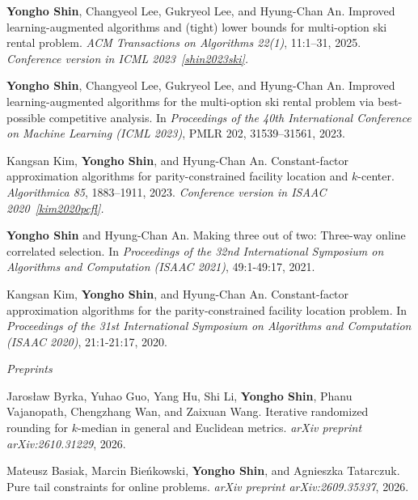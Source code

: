 \documentclass{article}
\begin{document}
\begin{enumerate}[label={[\arabic*]}]
	\item \label{shin2025ski} \textbf{Yongho Shin}, Changyeol Lee, Gukryeol Lee, and Hyung-Chan An. Improved learning-augmented algorithms and (tight) lower bounds for multi-option ski rental problem. \emph{ACM Transactions on Algorithms 22(1)}, 11:1--31, 2025. \emph{Conference version in ICML 2023~\ref{shin2023ski}.}
	
	\item \label{shin2023ski} \textbf{Yongho Shin}, Changyeol Lee, Gukryeol Lee, and Hyung-Chan An. Improved learning-augmented algorithms for the multi-option ski rental problem via best-possible competitive analysis. In \emph{Proceedings of the 40th International Conference on Machine Learning (ICML 2023)}, PMLR 202, 31539--31561, 2023.

	\item \label{kim2023pcfl} Kangsan Kim, \textbf{Yongho Shin}, and Hyung-Chan An. Constant-factor approximation algorithms for parity-constrained facility location and $k$-center. \emph{Algorithmica 85}, 1883–1911, 2023. \emph{Conference version in ISAAC 2020~\ref{kim2020pcfl}.}

	\item \label{shin2021ocs} \textbf{Yongho Shin} and Hyung-Chan An. Making three out of two: Three-way online correlated selection. In \emph{Proceedings of the 32nd International Symposium on Algorithms and Computation (ISAAC 2021)}, 49:1-49:17, 2021.

	\item \label{kim2020pcfl} Kangsan Kim, \textbf{Yongho Shin}, and Hyung-Chan An. Constant-factor approximation algorithms for the parity-constrained facility location problem. In \emph{Proceedings of the 31st International Symposium on Algorithms and Computation (ISAAC 2020)}, 21:1-21:17, 2020.
	
	\item[]\hspace{-2.5em}\textsl{Preprints}
	
	\item\label{byrka2026iterative} Jarosław Byrka, Yuhao Guo, Yang Hu, Shi Li, \textbf{Yongho Shin}, Phanu Vajanopath, Chengzhang Wan, and Zaixuan Wang. Iterative randomized rounding for $k$-median in general and Euclidean metrics. \emph{arXiv preprint arXiv:2610.31229}, 2026.
	
	\item \label{basiak2026tail} Mateusz Basiak, Marcin Bieńkowski, \textbf{Yongho Shin}, and Agnieszka Tatarczuk. Pure tail constraints for online problems. \emph{arXiv preprint arXiv:2609.35337}, 2026.
	

\end{enumerate}
\end{document}
